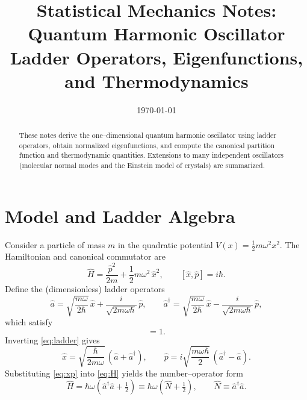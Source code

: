 \documentclass[12pt]{article}
\title{Statistical Mechanics Notes: Quantum Harmonic Oscillator\\\large Ladder Operators, Eigenfunctions, and Thermodynamics}
\author{}
\date{\today}
\numberwithin{equation}{section}
\newcommand{\h}{\hbar}
\newcommand{\w}{\omega}
\begin{document}
\maketitle
\begin{abstract}
These notes derive the one--dimensional quantum harmonic oscillator using ladder operators, obtain normalized eigenfunctions, and compute the canonical partition function and thermodynamic quantities. Extensions to many independent oscillators (molecular normal modes and the Einstein model of crystals) are summarized.
\end{abstract}

\section{Model and Ladder Algebra}
Consider a particle of mass $m$ in the quadratic potential $V(x)=\tfrac12 m\w^2 x^2$. The Hamiltonian and canonical commutator are
\begin{equation}
\hat H=\frac{\hat p^2}{2m}+\frac12 m\w^2\,\hat x^2, \qquad [\hat x,\hat p]=i\h.
\label{eq:H}
\end{equation}
Define the (dimensionless) ladder operators
\begin{equation}
\hat a=\sqrt{\frac{m\w}{2\h}}\,\hat x+\frac{i}{\sqrt{2m\w\h}}\,\hat p, \qquad \hat a^{\dagger}=\sqrt{\frac{m\w}{2\h}}\,\hat x-\frac{i}{\sqrt{2m\w\h}}\,\hat p,
\label{eq:ladder}
\end{equation}
which satisfy
\begin{equation}
[\hat a,\hat a^{\dagger}]=1.
\label{eq:comm}
\end{equation}
Inverting \eqref{eq:ladder} gives
\begin{equation}
\hat x=\sqrt{\frac{\h}{2m\w}}\,(\hat a+\hat a^{\dagger}), \qquad \hat p=i\sqrt{\frac{m\w\h}{2}}\,(\hat a^{\dagger}-\hat a).
\label{eq:xp}
\end{equation}
Substituting \eqref{eq:xp} into \eqref{eq:H} yields the number--operator form
\begin{equation}
\hat H=\h\w\left(\hat a^{\dagger}\hat a+\tfrac12\right)\equiv \h\w\left(\hat N+\tfrac12\right), \qquad \hat N\equiv\hat a^{\dagger}\hat a.
\label{eq:Hnumber}
\end{equation}
\end{document}
